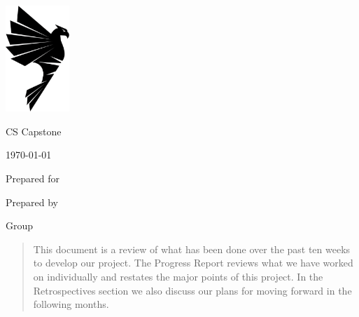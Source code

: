 \begin{singlespace}
\begin{titlepage}
    	\includegraphics[height=4cm]{Shirt_Graphic}
        \hfill 
        \par\vspace{.2in}
        \centering
        \scshape{
            \huge CS Capstone \DocType \par
            {\large\today}\par
            \vspace{.5in}
            \textbf{\Huge\CapstoneProjectName}\par
            \vfill
            {\large Prepared for}\par
            \Huge \CapstoneSponsorCompany\par
            \vspace{5pt}
            {\large Prepared by }\par
            Group\CapstoneTeamNumber\par
            \CapstoneTeamName\par 
            \vspace{5pt}
            {\Large
                \GroupMemberOne \par
                \GroupMemberTwo \par
                \GroupMemberThree \par
            }
            \vspace{20pt}
        }
        \begin{abstract}
        	This document is a review of what has been done over the past ten weeks to develop our project. The Progress Report reviews what we have worked on individually and restates the major points of this project. In the Retrospectives section we also discuss our plans for moving forward in the following months.
        \end{abstract}
\end{titlepage}
\newpage
{}
\tableofcontents
\newpage


\end{singlespace}
